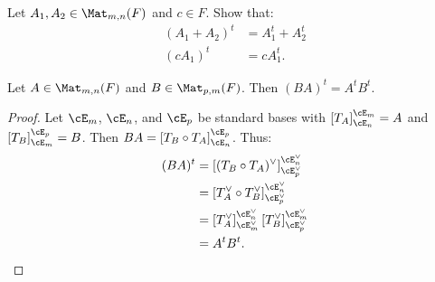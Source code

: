     \begin{exercise}
        Let $A_1,A_2 \in \Mat_{m,n}(F)$ and $c \in F$. Show that:
            \begin{equation*}
            \begin{split}
                (A_1 + A_2)^t & = A_1^t + A_2^t \\
                (cA_1)^t &= c A_1^t.
            \end{split}
            \end{equation*}
    \end{exercise}

    \begin{lemma}
        Let $A \in \Mat_{m,n}(F)$ and $B \in \Mat_{p,m}(F)$. Then $(BA)^t = A^t B^t$.
    \end{lemma}
        \begin{proof}
            Let $\cE_m$, $\cE_n$, and $\cE_p$ be standard bases with $\left[T_A\right]_{\cE_n}^{\cE_m} = A$ and $\left[T_B\right]_{\cE_m}^{\cE_p} = B$. Then $BA = \left[T_B \circ T_A\right]_{\cE_n}^{\cE_p}$. Thus:
                \begin{equation*}
                \begin{split}
                    (BA)^t
                    & = \left[(T_B \circ T_A)^\vee\right]_{\cE_p^\vee}^{\cE_n^\vee} \\
                    & = \left[T_A^\vee \circ T_B^\vee\right]_{\cE_p^\vee}^{\cE_n^\vee} \\
                    & = \left[T_A^\vee\right]_{\cE_m^\vee}^{\cE_n^\vee} \left[T_B^\vee\right]_{\cE_p^\vee}^{\cE_m^\vee}\\
                    & = A^t B^t.
                \end{split}
                \end{equation*}
        \end{proof}

